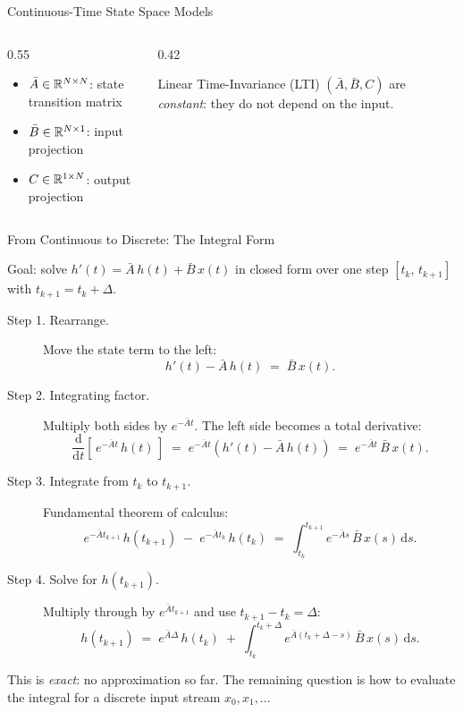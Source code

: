 \begin{frame}{Continuous-Time State Space Models}
  \vspace{0.2em}
  \begin{columns}
    \begin{column}{0.55\textwidth}
      \begin{itemize}
        \item $\bar{A} \in \mathbb{R}^{N \times N}$: state transition matrix
        \item $\bar{B} \in \mathbb{R}^{N \times 1}$: input projection
        \item $C \in \mathbb{R}^{1 \times N}$: output projection
      \end{itemize}
    \end{column}
    \begin{column}{0.42\textwidth}
      \begin{block}{Linear Time-Invariance (LTI)}
        $(\bar{A}, \bar{B}, C)$ are \emph{constant}: they do not depend on the input.
      \end{block}
    \end{column}
  \end{columns}
\end{frame}

\begin{frame}{From Continuous to Discrete: The Integral Form}

  Goal: solve $h'(t) = \bar{A}\,h(t) + \bar{B}\,x(t)$ in closed form over one step $[t_k,\, t_{k+1}]$ with $t_{k+1} = t_k + \Delta$.

  \begin{description}
    \item[Step 1. Rearrange.] Move the state term to the left:
      \[
        h'(t) - \bar{A}\,h(t) \;=\; \bar{B}\,x(t).
      \]
    \item[Step 2. Integrating factor.] Multiply both sides by $e^{-\bar{A} t}$. The left side becomes a total derivative:
      \[
        \frac{\mathrm{d}}{\mathrm{d}t}\!\left[\,e^{-\bar{A} t}\, h(t)\,\right]
        \;=\; e^{-\bar{A} t}\!\left(h'(t) - \bar{A}\,h(t)\right)
        \;=\; e^{-\bar{A} t}\, \bar{B}\, x(t).
      \]
    \item[Step 3. Integrate from $t_k$ to $t_{k+1}$.] Fundamental theorem of calculus:
      \[
        e^{-\bar{A} t_{k+1}}\, h(t_{k+1}) \;-\; e^{-\bar{A} t_k}\, h(t_k)
        \;=\; \int_{t_k}^{t_{k+1}} e^{-\bar{A} s}\, \bar{B}\, x(s)\,\mathrm{d}s.
      \]
    \item[Step 4. Solve for $h(t_{k+1})$.] Multiply through by $e^{\bar{A} t_{k+1}}$ and use $t_{k+1} - t_k = \Delta$:
      \[
        \boxed{\;
        h(t_{k+1}) \;=\; e^{\bar{A}\Delta}\, h(t_k)
        \;+\; \int_{t_k}^{t_k+\Delta} e^{\bar{A}(t_k + \Delta - s)}\, \bar{B}\, x(s)\,\mathrm{d}s.
        \;}
      \]
  \end{description}

  This is \emph{exact}: no approximation so far. The remaining question is how to evaluate the integral for a discrete input stream $x_0, x_1, \ldots$
\end{frame}

